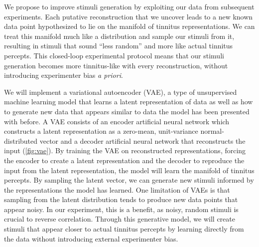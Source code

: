 \documentclass[11pt, notitlepage]{article} %
\begin{document}
We propose to improve stimuli generation by exploiting our data from subsequent experiments.
Each putative reconstruction that we uncover leads to a new known data point hypothesized to lie on the manifold
of tinnitus representations.
We can treat this manifold much like a distribution and sample our stimuli from it,
resulting in stimuli that sound ``less random'' and more like actual tinnitus percepts.
This closed-loop experimental protocol means that our stimuli generation becomes more tinnitus-like
with every reconstruction, without introducing experimenter bias \emph{a priori}.

We will implement a variational autoencoder (VAE), a type of unsupervised machine learning model
that learns a latent representation of data as well as how to generate new data
that appears similar to data the model has been presented with before.
A VAE consists of an encoder artificial neural network
which constructs a latent representation
as a zero-mean, unit-variance normal-distributed vector
and a decoder artificial neural network
that reconstructs the input (\autoref{fig:vae}).
By training the VAE on reconstructed representations,
forcing the encoder to create a latent representation
and the decoder to reproduce the input from the latent representation,
the model will learn the manifold of tinnitus percepts.
By sampling the latent vector,
we can generate new stimuli informed by the representations the model has learned.
One limitation of VAEs is that sampling from the latent distribution
tends to produce new data points that appear noisy.
In our experiment, this is a benefit,
as noisy, random stimuli is crucial to reverse correlation.
Through this generative model,
we will create stimuli that appear closer to actual tinnitus percepts
by learning directly from the data
without introducing external experimenter bias.
\end{document}
